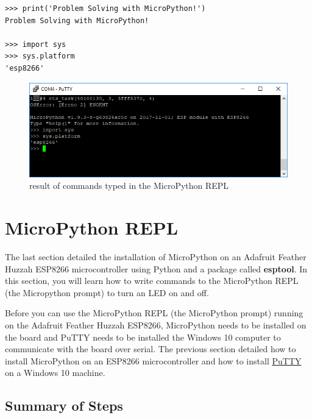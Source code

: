 \documentclass{book}
\makeatletter
\def\maxwidth{\ifdim\Gin@nat@width>\linewidth\linewidth
    \else\Gin@nat@width\fi}
\let\Oldincludegraphics\includegraphics
\renewcommand{\includegraphics}[1]{\Oldincludegraphics[width=.8\maxwidth]{#1}}
\makeatother
\begin{document}
\begin{lstlisting}
>>> print('Problem Solving with MicroPython!')
Problem Solving with MicroPython!

>>> import sys
>>> sys.platform
'esp8266'
\end{lstlisting}

\begin{figure}
\centering
\includegraphics{images/sys_dot_platform.PNG}
\caption{result of commands typed in the MicroPython REPL}
\end{figure}
    




    
        \section{MicroPython REPL}\label{micropython-repl}
    




    
        The last section detailed the installation of MicroPython on an Adafruit
Feather Huzzah ESP8266 microcontroller using Python and a package called
\textbf{esptool}. In this section, you will learn how to write commands
to the MicroPython REPL (the Micropython prompt) to turn an LED on and
off.

Before you can use the MicroPython REPL (the MicroPython prompt) running
on the Adafruit Feather Huzzah ESP8266, MicroPython needs to be
installed on the board and PuTTY needs to be installed the Windows 10
computer to communicate with the board over serial. The previous section
detailed how to install MicroPython on an ESP8266 microcontroller and
how to install \href{https://www.putty.org/}{PuTTY} on a Windows 10
machine.
    




    
        \subsection{Summary of Steps}\label{summary-of-steps}
    
\end{document}
